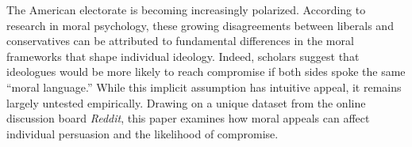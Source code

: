 The American electorate is becoming increasingly polarized. According to research in moral psychology, these growing disagreements between liberals and conservatives can be attributed to fundamental differences in the moral frameworks that shape individual ideology. Indeed, scholars suggest that ideologues would be more likely to reach compromise if both sides spoke the same ``moral language.'' While this implicit assumption has intuitive appeal, it remains largely untested empirically. Drawing on a unique dataset from the online discussion board \emph{Reddit}, this paper examines how moral appeals can affect individual persuasion and the likelihood of compromise. %